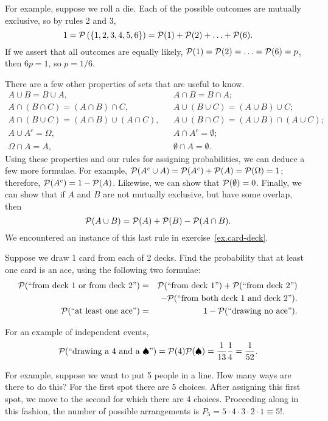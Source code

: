 For example, suppose we roll a die. Each of the possible outcomes are mutually exclusive, so by rules 2 and 3,
\[
	1 = \mathcal{P}\left(\{1,2,3,4,5,6\}\right) = \mathcal{P}(1) + \mathcal{P}(2) +\ldots+\mathcal{P}(6).
\]
If we assert that all outcomes are equally likely, $\mathcal{P}(1)=\mathcal{P}(2)=\ldots=\mathcal{P}(6)=p$, then $6p = 1$, so $p = 1/6$.

There are a few other properties of sets that are useful to know.
\begin{eqnarray*}
	A\cup B = B\cup A, && A\cap B = B\cap A;\\
	A\cap(B\cap C) = (A\cap B)\cap C, && A\cup(B\cup C) = (A\cup B)\cup C;\\
	A\cap(B\cup C) = (A\cap B)\cup(A\cap C), && A\cup(B\cap C) = (A\cup B)\cap(A\cup C);\\
	A\cup A^{c} = \Omega, && A\cap A^{c} = \emptyset;\\
	\Omega\cap A = A, && \emptyset\cap A = \emptyset.
\end{eqnarray*}
Using these properties and our rules for assigning probabilities, we can deduce a few more formulae. For example, $\mathcal{P}(A^{c}\cup A) =  \mathcal{P}(A^{c}) + \mathcal{P}(A) = \mathcal{P}(\Omega) = 1$; therefore, $\mathcal{P}(A^{c}) = 1-\mathcal{P}(A)$.  Likewise, we can show that $\mathcal{P}(\emptyset)=0$.  
Finally, we can show that if $A$ and $B$ are not mutually exclusive, but have some overlap, then
\[ \mathcal{P}(A\cup B) = \mathcal{P}(A)+\mathcal{P}(B) - \mathcal{P}(A\cap B). \]
We encountered an instance of this last rule in exercise~\ref{ex.card-deck}.

\begin{exercisebox}
Suppose we draw 1 card from each of 2 decks.  Find the probability that at least one card is an ace, using the following two formulae:
\begin{eqnarray*}
\mathcal{P}(\textrm{``from deck 1 or from deck 2''}) &=& \mathcal{P}(\textrm{``from deck 1''})+	\mathcal{P}(\textrm{``from deck 2''}) \\
&& - \mathcal{P}(\textrm{``from both deck 1 and deck 2''}).\\
\mathcal{P}(\textrm{``at least one ace''}) &=& 1-\mathcal{P}(\textrm{``drawing no ace''}).
\end{eqnarray*}
\end{exercisebox}

For an example of independent events,
\[
 \mathcal{P}(\textrm{``drawing a 4 and a $\spadesuit$''}) = \mathcal{P}(4)\mathcal{P}(\spadesuit) = \frac{1}{13}\frac{1}{4} = \frac{1}{52}.
 \]
 
 For example, suppose we want to put 5 people in a line. How many ways are there to do this?  For the first spot there are 5 choices.  After assigning this first spot, we move to the second for which there are 4 choices.  Proceeding along in this fashion, the number of possible arrangements is $P_{5} = 5\cdot4\cdot3\cdot2\cdot1 \equiv 5!$.

